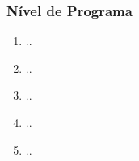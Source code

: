 \subsubsection{Nível de Programa}
	\begin{enumerate}[label = (\alph*)]
		\item ..
		\item ..
		\item ..
		\item ..
		\item ..
	\end{enumerate}